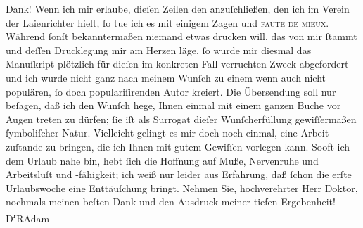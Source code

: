 \begin{ledgroupsized}[t]{13cm}
               Dank!\pend
           \pstart
           Wenn ich mir erlaube, dieſen Zeilen den \label{K_L02514-1v}\label{K_L02514-1h} anzuſchließen, den ich im Verein der Laienrichter hielt, ſo tue ich es mit einigem Zagen und \textsc{faute de mieux}. Während ſonſt bekanntermaßen niemand etwas
               drucken will, das von mir ſtammt und deſſen Drucklegung mir am Herzen läge, ſo wurde
               mir diesmal das Manuſkript plötzlich für dieſen im konkreten Fall verruchten Zweck
               abgefordert und ich wurde nicht ganz nach meinem Wunſch zu einem wenn auch nicht
               populären, ſo doch populariſirenden Autor kreiert. Die Übersendung soll nur beſagen,
               daß ich den Wunſch hege, Ihnen einmal mit einem ganzen Buche {\pb}vor Augen treten zu dürfen; ſie iſt als
               Surrogat dieſer Wunſcherfüllung gewiſſermaßen ſymboliſcher Natur.\pend
           \pstart
           Vielleicht gelingt es mir doch noch einmal, eine Arbeit zuſtande zu bringen, die ich
               Ihnen mit gutem Gewiſſen vorlegen kann. Sooft ich dem Urlaub nahe bin, hebt ſich die
               Hoffnung auf Muße, Nervenruhe und Arbeitsluſt und -fähigkeit; ich weiß nur leider aus
               Erfahrung, daß ſchon die erſte Urlaubswoche eine Enttäuſchung bringt.\pend
           \pstart
           Nehmen Sie, hochverehrter Herr Doktor, nochmals meinen beſten Dank und den Ausdruck
               meiner tiefen Ergebenheit!\pend
           \pstart \spacefill\mbox{D\textsuperscript{r}RAdam}\pend{}
         
         \endnumbering{}\end{ledgroupsized}  \newcommand{\dateiname}{L02514}\newcommand{\titel}{Robert Adam an Arthur Schnitzler, 22. 7. 1929}\newcommand{\editorInnen}{Martin Anton Müller und Gerd-Hermann Susen}
      